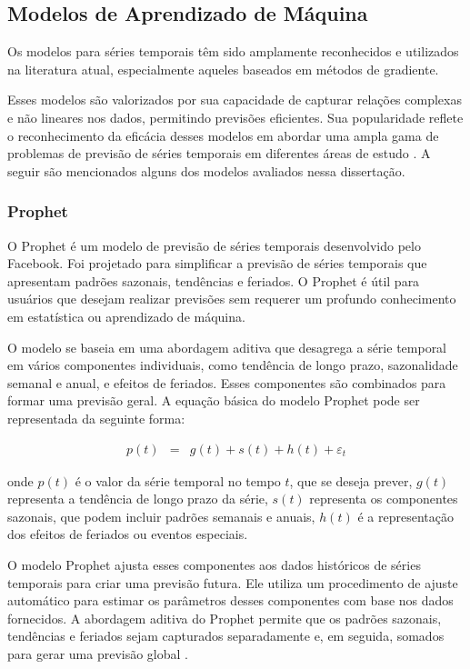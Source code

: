 \subsection{Modelos de Aprendizado de M\'aquina}\label{subsec:reg}
 
 Os modelos para séries temporais têm sido amplamente reconhecidos e utilizados na literatura atual, especialmente aqueles baseados em métodos de gradiente. 
 
 Esses modelos são valorizados por sua capacidade de capturar relações complexas e não lineares nos dados, permitindo previsões eficientes. Sua popularidade reflete o reconhecimento da eficácia desses modelos em abordar uma ampla gama de problemas de previsão de séries temporais em diferentes áreas de estudo \cite{al2021machine, sen2022machine, kheiri2023sentimentgpt}.
 A seguir são mencionados alguns dos modelos avaliados nessa dissertação.
 
 
 \subsubsection{Prophet}
 
 
 O Prophet é um modelo de previsão de séries temporais desenvolvido pelo Facebook. Foi projetado para simplificar a previsão de séries temporais que apresentam padrões sazonais, tendências e feriados. O Prophet é útil para usuários que desejam realizar previsões sem requerer um profundo conhecimento em estatística ou aprendizado de máquina.
 
 O modelo se baseia em uma abordagem aditiva que desagrega a série temporal em vários componentes individuais, como tendência de longo prazo, sazonalidade semanal e anual, e efeitos de feriados. Esses componentes são combinados para formar uma previsão geral.
 A equação básica do modelo Prophet pode ser representada da seguinte forma:
 
 \begin{eqnarray}
 	p(t) &=& g(t) + s(t) + h(t) + \varepsilon_t 
 \end{eqnarray}
 
 \noindent onde \( p(t) \) é o valor da série temporal no tempo \( t \), que se deseja prever, \( g(t) \) representa a tendência de longo prazo da série, \( s(t) \) representa os componentes sazonais, que podem incluir padrões semanais e anuais, \( h(t) \) é a representação dos efeitos de feriados ou eventos especiais.
 
 
 O modelo Prophet ajusta esses componentes aos dados históricos de séries temporais para criar uma previsão futura. Ele utiliza um procedimento de ajuste automático para estimar os parâmetros desses componentes com base nos dados fornecidos. A abordagem aditiva do Prophet permite que os padrões sazonais, tendências e feriados sejam capturados separadamente e, em seguida, somados para gerar uma previsão global \cite{2-s2.0-85092514286}.
 
